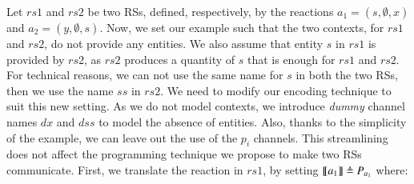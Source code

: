\begin{example}
\label{ex:twoRS}
Let  $rs1$ and $rs2$ be two RSs, defined, respectively, by the reactions 
$a_1=(s,\emptyset , x)$ and $a_2=(y,\emptyset  ,s)$.
%
%
Now, we set our example such that the two contexts, for  $rs1$ and $rs2$, do not provide any entities.
We also assume that entity $s$ in $rs1$ is provided by $rs2$, as $rs2$ produces a quantity of $s$ that is enough for $rs1$ and $rs2$.
For technical reasons, we can not use the same name for  $s$ in both the two RSs, then we use the name $ss$ in $rs2$.
%
We need to modify our encoding
technique to suit this new setting. 
As we do not model contexts, we introduce  \emph{dummy} channel names $dx$ and $dss$ to model the absence of entities. Also, thanks to the simplicity of the example, we can leave out the use of the   $p_i$ channels. This streamlining does not affect the programming technique we propose to make two RSs communicate.
First, we translate the reaction in $rs1$, by setting
$\llbracket a_1\rrbracket \triangleq P_{a_1}$ where:
\[
\begin{array}{lcl}

\end{array}\]
\end{example}
